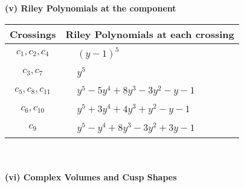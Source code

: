 \documentclass[1p]{elsarticle_modified}
\theoremstyle{definition}
\begin{document}
\newpage\renewcommand{\arraystretch}{1}
\flushleft \textbf{(v) Riley Polynomials at the component}\newline \\
\begin{tabular}{m{50pt}|m{274pt}}
Crossings & \hspace{64pt}Riley Polynomials at each crossing \\
\hline $$\begin{aligned}c_{1},c_{2},c_{4}\end{aligned}$$&$\begin{aligned}
&(y-1)^5
\end{aligned}$\\
\hline $$\begin{aligned}c_{3},c_{7}\end{aligned}$$&$\begin{aligned}
&y^5
\end{aligned}$\\
\hline $$\begin{aligned}c_{5},c_{8},c_{11}\end{aligned}$$&$\begin{aligned}
&y^5-5 y^4+8 y^3-3 y^2- y-1
\end{aligned}$\\
\hline $$\begin{aligned}c_{6},c_{10}\end{aligned}$$&$\begin{aligned}
&y^5+3 y^4+4 y^3+y^2- y-1
\end{aligned}$\\
\hline $$\begin{aligned}c_{9}\end{aligned}$$&$\begin{aligned}
&y^5- y^4+8 y^3-3 y^2+3 y-1
\end{aligned}$\\
\hline
\end{tabular}\\~\\
\newpage\flushleft \textbf{(vi) Complex Volumes and Cusp Shapes}
\end{document}
